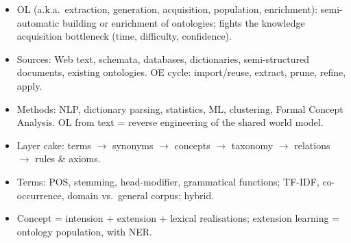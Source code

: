\begin{nbsummary}
\begin{itemize}[nosep]
  \item OL (a.k.a.\ extraction, generation, acquisition, population, enrichment):
        semi-automatic building or enrichment of ontologies; fights the knowledge
        acquisition bottleneck (time, difficulty, confidence).
  \item Sources: Web text, schemata, databases, dictionaries, semi-structured documents,
        existing ontologies. OE cycle: import/reuse, extract, prune, refine, apply.
  \item Methods: NLP, dictionary parsing, statistics, ML, clustering, Formal Concept
        Analysis. OL from text = reverse engineering of the shared world model.
  \item Layer cake: terms $\to$ synonyms $\to$ concepts $\to$ taxonomy $\to$ relations
        $\to$ rules \& axioms.
  \item Terms: POS, stemming, head-modifier, grammatical functions; TF-IDF,
        co-occurrence, domain vs.\ general corpus; hybrid.
  \item Concept = intension + extension + lexical realisations; extension learning =
        ontology population, with NER.
\end{itemize}
\end{nbsummary}

